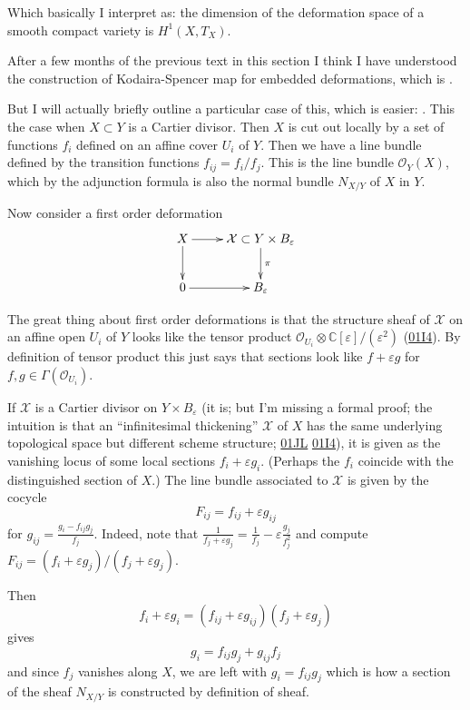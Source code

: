 Which basically I interpret as: the dimension
of the deformation space of a
smooth compact variety is $H^{1}(X,T_X)$.

\medskip\noindent
After a few months of the previous text in
this section
I think I have understood the construction of
Kodaira-Spencer map for embedded
deformations,
which is \cite[Proposition
3.2.1(ii)]{Sernesi-deformations}.

But I will actually briefly outline a
particular case
of this, which is easier: \cite[Examples
3.2.4(ii)]{Sernesi-deformations}.
This the case when $X \subset Y$ is a Cartier
divisor.
Then $X$ is cut out locally by a set of
functions $f_i$
defined on an affine cover $U_i$ of $Y$.
Then we have a line bundle defined by the
transition functions $f_{ij}=f_i/f_j$.
This is the line bundle $\mathcal{O}_Y(X)$,
which
by the adjunction formula is also the normal
bundle $N_{X/Y}$
of $X$ in $Y$.

Now consider a first order deformation
$$
\xymatrix{
X\ar[r]\ar[d]
&\mathcal{X}\subset Y\times
B_\varepsilon\ar[d]^\pi\\
0\ar[r]
&B_\varepsilon
}
$$

The great thing about first order
deformations
is that the structure sheaf of $\mathcal{X}$
on an affine open $U_i$ of $Y$
looks like the tensor product
$\mathcal{O}_{U_i}\otimes
\mathbb{C}[\varepsilon]/(\varepsilon^2)$
(\href{https://stacks.math.columbia.edu/tag/%
01I4}{01I4}).
By definition of tensor product this just
says
that sections look like $f+\varepsilon g$
for $f,g \in \Gamma(\mathcal{O}_{U_i})$.

If $\mathcal{X}$ is a Cartier divisor on $Y
\times B_\varepsilon$
(it is; but I'm missing a formal proof;
the intuition is that an ``infinitesimal
thickening'' $\mathcal{X}$
of $X$ has the same underlying topological
space
but different scheme structure;
\href{https://stacks.math.columbia.edu/tag/%
01JL}{01JL}
\href{https://stacks.math.columbia.edu/tag/%
01I4}{01I4}),
it is given as the vanishing locus
of some local sections $f_i+\varepsilon g_i$.
(Perhaps the $f_i$ coincide with the
distinguished
section of $X$.)
The line bundle associated to $\mathcal{X}$
is given by the cocycle
$$
F_{ij}=f_{ij}+\varepsilon g_{ij}
$$
for $g_{ij}=\frac{g_i-f_{ij}g_j}{f_j}$.
Indeed, note that
$\frac{1}{f_j+\varepsilon
g_j}=\frac{1}{f_j}-\varepsilon
\frac{g_j}{f^2_j}$
and compute $F_{ij}=(f_i+\varepsilon
g_j)/(f_j+\varepsilon g_j)$.

Then
$$
f_i+\varepsilon g_i=(f_{ij}+\varepsilon
g_{ij})(f_j+\varepsilon g_j)
$$
gives
$$
g_i=f_{ij}g_j+g_{ij}f_j
$$
and since $f_j$ vanishes along $X$,
we are left with $g_i=f_{ij}g_j$
which is how a section of the sheaf $N_{X/Y}$
is constructed by definition of sheaf.


